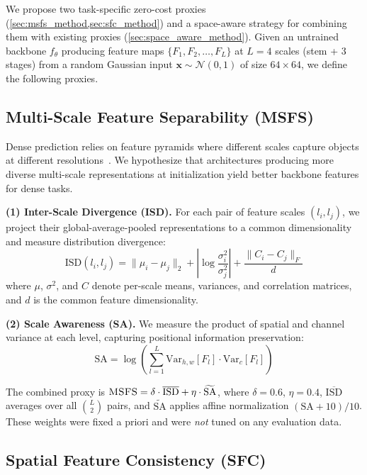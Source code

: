 \documentclass[10pt,twocolumn,letterpaper]{article}
\newcommand{\sfc}{\textsc{SFC}}
\newcommand{\msfs}{\textsc{MSFS}}
\begin{document}
We propose two task-specific zero-cost proxies (\cref{sec:msfs_method,sec:sfc_method}) and a space-aware strategy for combining them with existing proxies (\cref{sec:space_aware_method}).
Given an untrained backbone $f_\theta$ producing feature maps $\{F_1, F_2, \ldots, F_L\}$ at $L{=}4$ scales (stem + 3 stages) from a random Gaussian input $\mathbf{x} \sim \mathcal{N}(0,1)$ of size $64 \times 64$, we define the following proxies.

\subsection{Multi-Scale Feature Separability (\msfs{})}
\label{sec:msfs_method}

Dense prediction relies on feature pyramids where different scales capture objects at different resolutions~\cite{lin2017fpn}.
We hypothesize that architectures producing more diverse multi-scale representations at initialization yield better backbone features for dense tasks.

\textbf{(1) Inter-Scale Divergence (ISD).}
For each pair of feature scales $(l_i, l_j)$, we project their global-average-pooled representations to a common dimensionality and measure distribution divergence:
\begin{equation}
\text{ISD}(l_i, l_j) = \|\mu_i {-} \mu_j\|_2 + \left|\log\frac{\sigma^2_i}{\sigma^2_j}\right| + \frac{\|C_i {-} C_j\|_F}{d}
\end{equation}
where $\mu$, $\sigma^2$, and $C$ denote per-scale means, variances, and correlation matrices, and $d$ is the common feature dimensionality.

\textbf{(2) Scale Awareness (SA).}
We measure the product of spatial and channel variance at each level, capturing positional information preservation:
\begin{equation}
\text{SA} = \log\left(\sum_{l=1}^{L} \text{Var}_{h,w}[F_l] \cdot \text{Var}_{c}[F_l]\right)
\end{equation}

The combined proxy is $\msfs{} = \delta \cdot \overline{\text{ISD}} + \eta \cdot \widetilde{\text{SA}}$, where $\delta{=}0.6$, $\eta{=}0.4$, $\overline{\text{ISD}}$ averages over all $\binom{L}{2}$ pairs, and $\widetilde{\text{SA}}$ applies affine normalization $(\text{SA}{+}10)/10$.
These weights were fixed a priori and were \emph{not} tuned on any evaluation data.

\subsection{Spatial Feature Consistency (\sfc{})}
\label{sec:sfc_method}
\end{document}
